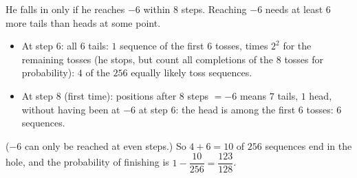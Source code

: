 He falls in only if he reaches $-6$ within $8$ steps. Reaching $-6$ needs at least $6$ more tails than heads at some point.
\begin{itemize}
\item At step $6$: all $6$ tails: $1$ sequence of the first $6$ tosses, times $2^2$ for the remaining tosses (he stops, but count all completions of the $8$ tosses for probability): $4$ of the $256$ equally likely toss sequences.
\item At step $8$ (first time): positions after $8$ steps $=-6$ means $7$ tails, $1$ head, without having been at $-6$ at step $6$: the head is among the first $6$ tosses: $6$ sequences.
\end{itemize}
($-6$ can only be reached at even steps.) So $4+6=10$ of $256$ sequences end in the hole, and the probability of finishing is $1-\dfrac{10}{256}=\boxed{\dfrac{123}{128}}$.
